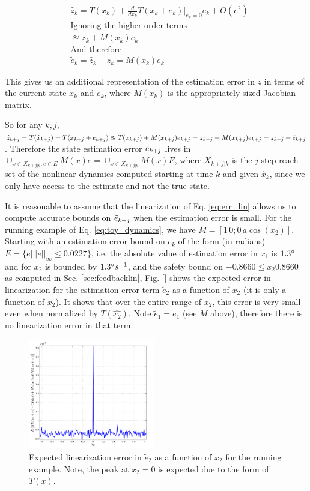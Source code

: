 \begin{subequations}
\label{eq:err_lin}
\begin{align}
&\hat{z}_k = T(x_k) + \frac{d}{dx_k} T(x_k+e_k)|_{e_k=0}e_k + O(e^2) \\
&\text{Ignoring the higher order terms} \nonumber \\
&\approxeq z_k + M(x_k)e_k  \\
&\text{And therefore} \nonumber \\
&\tilde{e}_k = \hat{z}_k - z_k = M(x_k)e_k
\end{align}
\end{subequations}

This gives us an additional representation of the estimation error in $z$ in terms of the current state $x_k$ and $e_k$, where $M(x_k)$ is the appropriately sized Jacobian matrix. 

So for any $k,j$, $\hat{z}_{k+j} = T(\hat{x}_{k+j}) = T(x_{k+j} + e_{k+j}) \approxeq T(x_{k+j}) + M(x_{k+j})e_{k+j} = z_{k+j} + M(x_{k+j})e_{k+j} = z_{k+j} + \tilde{e}_{{k+j}}$.
Therefore the state estimation error $\tilde{e}_{k+j}$ lives in 
$\cup_{x\in X_{k+j|k}, e \in E}M(x)e = \cup_{x \in X_{k+j|k}}M(x)E$, 
where $X_{k+j|k}$ is the $j$-step reach set of the nonlinear dynamics computed starting at time $k$ and given $\hat{x}_k$, since we only have access to the estimate and not the true state.

It is reasonable to assume that the linearization of Eq. \ref{eq:err_lin} allows us to compute accurate bounds on $\tilde{e}_{k+j}$ when the estimation error is small. For the running example of Eq. \ref{eq:toy_dynamics}, we have $M = [1 \, 0;0 \,a\cos(x_2)]$. Starting with an estimation error bound on $e_k$ of the form (in radians) $E = \lbrace e| ||e||_{\infty} \leq 0.0227\rbrace$, i.e. the absolute value of estimation error in $x_1$ is $1.3\degree$ and for $x_2$ is bounded by $1.3\degree s^{-1}$, and the safety bound on $-0.8660\leq x_2 0.8660$ as computed in Sec. \ref{sec:feedbacklin}, Fig. \ref{} shows the expected error in linearization for the estimation error term $\tilde{e}_2$ as a function of $x_2$ (it is only a function of $x_2$). It shows that over the entire range of $x_2$, this error is very small even when normalized by $T(\hat{x_2})$. Note $\tilde{e}_1 = e_1$ (see $M$ above), therefore there is no linearization error in that term.


\begin{figure}
\includegraphics[width=0.49\textwidth]{figs/Toy_LinErrEst_scissored.pdf}
\caption{Expected linearization error in $\tilde{e}_2$ as a function of $x_2$ for the running example. Note, the peak at $x_2=0$ is expected due to the form of $T(x)$. }
\label{fig:v_and_limits}
\end{figure}
